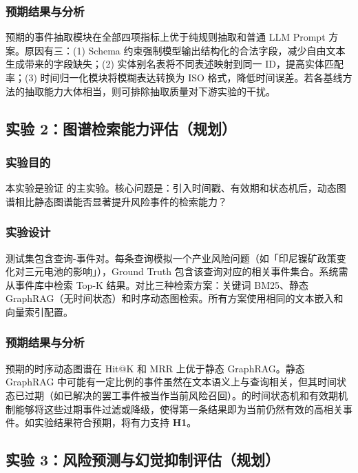 \subsubsection{预期结果与分析}

预期\projectshort 的事件抽取模块在全部四项指标上优于纯规则抽取和普通 LLM Prompt 方案。原因有三：(1) Schema 约束强制模型输出结构化的合法字段，减少自由文本生成带来的字段缺失；(2) 实体别名表将不同表述映射到同一 ID，提高实体匹配率；(3) 时间归一化模块将模糊表达转换为 ISO 格式，降低时间误差。若各基线方法的抽取能力大体相当，则可排除抽取质量对下游实验的干扰。

\subsection{实验 2：图谱检索能力评估（规划）}
\label{sec:exp-retrieval}

\subsubsection{实验目的}

本实验是验证  的主实验。核心问题是：引入时间戳、有效期和状态机后，动态图谱相比静态图谱能否显著提升风险事件的检索能力？

\subsubsection{实验设计}

测试集包含查询-事件对。每条查询模拟一个产业风险问题（如「印尼镍矿政策变化对三元电池的影响」），Ground Truth 包含该查询对应的相关事件集合。系统需从事件库中检索 Top-K 结果。对比三种检索方案：关键词 BM25、静态 GraphRAG（无时间状态）和\projectshort 时序动态图检索。所有方案使用相同的文本嵌入和向量索引配置。

\subsubsection{预期结果与分析}

预期\projectshort 的时序动态图谱在 Hit@K 和 MRR 上优于静态 GraphRAG。静态 GraphRAG 中可能有一定比例的事件虽然在文本语义上与查询相关，但其时间状态已过期（如已解决的罢工事件被当作当前风险召回）。\projectshort 的时间状态机和有效期机制能够将这些过期事件过滤或降级，使得第一条结果即为当前仍然有效的高相关事件。如实验结果符合预期，将有力支持 \textbf{H1}。

\subsection{实验 3：风险预测与幻觉抑制评估（规划）}
\label{sec:exp-prediction}

